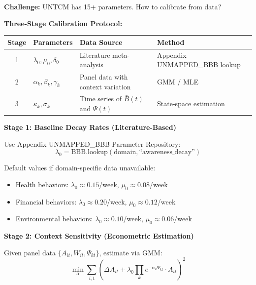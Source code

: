 \begin{tcolorbox}[colback=green!5!white, colframe=green!75!black,
    title=\textbf{Method UNTCM-M2: Parameter Calibration Protocol}]

\textbf{Challenge:} UNTCM has 15+ parameters. How to calibrate from data?

\textbf{Three-Stage Calibration Protocol:}

\begin{center}
\renewcommand{\arraystretch}{1.3}
\begin{tabular}{@{}clll@{}}
\toprule
\textbf{Stage} & \textbf{Parameters} & \textbf{Data Source} & \textbf{Method} \\
\midrule
1 & $\lambda_0, \mu_0, \delta_0$ & Literature meta-analysis & Appendix UNMAPPED_BBB lookup \\
2 & $\alpha_k, \beta_k, \gamma_k$ & Panel data with context variation & GMM / MLE \\
3 & $\kappa_k, \sigma_k$ & Time series of $\bar{B}(t)$ and $\Psi(t)$ & State-space estimation \\
\bottomrule
\end{tabular}
\end{center}

\textbf{Stage 1: Baseline Decay Rates (Literature-Based)}

Use Appendix UNMAPPED_BBB Parameter Repository:
\begin{equation}
\lambda_0 = \text{BBB.lookup}(\text{domain}, \text{``awareness\_decay''})
\end{equation}

Default values if domain-specific data unavailable:
\begin{itemize}[nosep]
\item Health behaviors: $\lambda_0 \approx 0.15$/week, $\mu_0 \approx 0.08$/week
\item Financial behaviors: $\lambda_0 \approx 0.20$/week, $\mu_0 \approx 0.12$/week
\item Environmental behaviors: $\lambda_0 \approx 0.10$/week, $\mu_0 \approx 0.06$/week
\end{itemize}

\textbf{Stage 2: Context Sensitivity (Econometric Estimation)}

Given panel data $\{A_{it}, W_{it}, \Psi_{kt}\}$, estimate via GMM:
\begin{equation}
\min_{\alpha} \sum_{i,t} \left( \Delta A_{it} + \lambda_0 \prod_k e^{-\alpha_k \Psi_{kt}} \cdot A_{it} \right)^2
\end{equation}


\end{tcolorbox}
